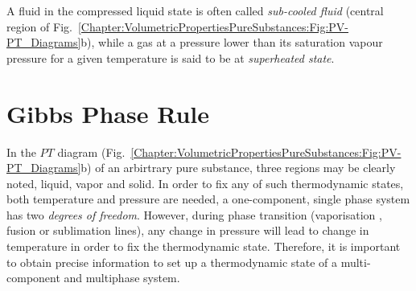 A fluid in the compressed liquid state is often called {\it sub-cooled fluid} (central region of Fig.~\ref{Chapter:VolumetricPropertiesPureSubstances:Fig:PV-PT_Diagrams}b), while a gas at a pressure lower than its saturation vapour pressure for a given temperature is said to be at {\it superheated state}.


\section{Gibbs Phase Rule}\label{Chapter:VolumetricPropertiesPureSubstances:Section:GibbsPhaseRule}
  In the $PT$ diagram (Fig.~\ref{Chapter:VolumetricPropertiesPureSubstances:Fig:PV-PT_Diagrams}b) of an arbirtrary pure substance, three regions may be clearly noted, liquid, vapor and solid. In order to fix any of such thermodynamic states, both temperature and pressure are needed, \ie a one-component, single phase system has two {\it degrees of freedom}. However, during phase transition (\eg vaporisation , fusion or sublimation lines), any change in pressure will lead to change in temperature in order to fix the thermodynamic state. Therefore, it is important to obtain precise information to set up a thermodynamic state of a multi-component and multiphase system.

